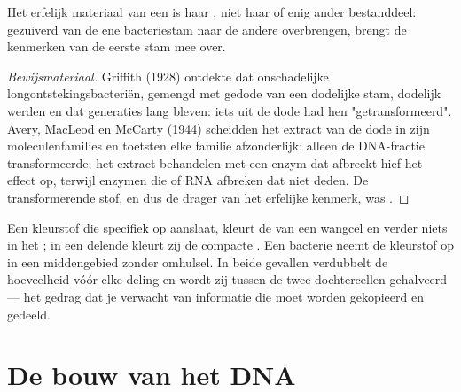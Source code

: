 \begin{proposition}\label{prop:g10:universal-dna:material}
Het erfelijk materiaal van een  is haar , niet haar  of
enig ander bestanddeel: gezuiverd  van de ene bacteriestam naar de
andere overbrengen, brengt de kenmerken van de eerste stam mee over.
\end{proposition}
\begin{proof}[Bewijsmateriaal]
Griffith (1928) ontdekte dat onschadelijke longontstekingsbacteriën,
gemengd met gedode  van een dodelijke stam, dodelijk werden en dat
generaties lang bleven: iets uit de dode  had hen
"getransformeerd". Avery, MacLeod en McCarty (1944) scheidden het
extract van de dode  in zijn moleculenfamilies en toetsten elke
familie afzonderlijk: alleen de DNA-fractie transformeerde; het extract
behandelen met een enzym dat  afbreekt hief het effect op, terwijl
enzymen die  of RNA afbreken dat niet deden. De transformerende
stof, en dus de drager van het erfelijke kenmerk, was .
\end{proof}

\begin{example}\label{ex:g10:universal-dna:where}
Een kleurstof die specifiek op  aanslaat, kleurt de  van een
wangcel en verder niets in het ; in een delende  kleurt zij
de compacte . Een bacterie neemt de kleurstof op in een
middengebied zonder omhulsel. In beide gevallen verdubbelt de
hoeveelheid  vóór elke deling en wordt zij tussen de twee
dochtercellen gehalveerd --- het gedrag dat je verwacht van informatie
die moet worden gekopieerd en gedeeld.
\end{example}

\section{De bouw van het DNA}


